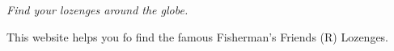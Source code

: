 {\itshape Find your lozenges around the globe.}

This website helps you fo find the famous Fisherman's Friends (R) Lozenges. 